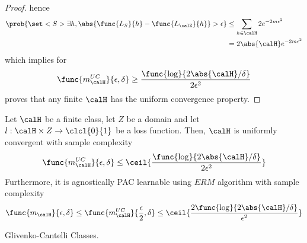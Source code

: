 \begin{proof}
    hence 
    \begin{align*}
        \prob{\set<S>{\exists h, \abs{\func{L_S}{h} - \func{L_{\calZ}}{h}} > \epsilon}} & \leq \sum_{h \in \calH} 2 e^{-2m\epsilon^2}\\
        &= 2 \abs{\calH} e^{-2m \epsilon^2} 
    \end{align*}
    which implies for 
    \begin{equation*}
        \func{m^{UC}_{\calH}}{\epsilon, \delta} \geq \dfrac{\func{\log }{2\abs{\calH} / \delta}}{2\epsilon^2}
    \end{equation*}
    proves that any finite \(\calH\) has the uniform convergence property.
\end{proof}

\begin{corollary}
    Let \(\calH\) be a finite class, let \(Z\) be a domain and let \(l:\calH \times Z \to \clcl{0}{1}\) be a loss function. Then, \(\calH\) is uniformly convergent with sample complexity 
    \begin{equation*}
        \func{m^{UC}_{\calH}}{\epsilon, \delta} \leq \ceil{\dfrac{\func{\log }{2\abs{\calH} / \delta}}{2\epsilon^2}}
    \end{equation*}
    Furthermore, it is agnostically PAC learnable using \(ERM\) algorithm with sample complexity 
    \begin{equation*}
        \func{m_{\calH}}{\epsilon,\delta} \leq \func{m^{UC}_{\calH}}{\frac{\epsilon}{2}, \delta} \leq \ceil{\dfrac{2\func{\log }{2\abs{\calH} / \delta}}{\epsilon^2}}
    \end{equation*}
\end{corollary}

Glivenko-Cantelli Classes.